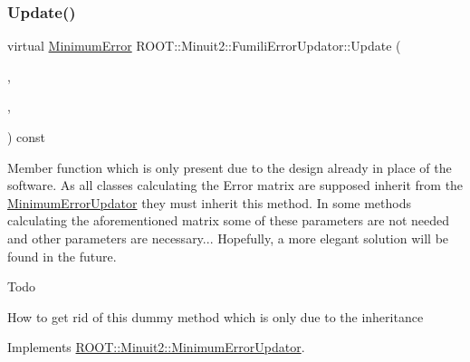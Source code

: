 \subsubsection{\texorpdfstring{Update()}{Update()}\hspace{0.1cm}{\footnotesize\ttfamily [4/6]}}
{\footnotesize\ttfamily virtual \mbox{\hyperlink{classROOT_1_1Minuit2_1_1MinimumError}{Minimum\+Error}} R\+O\+O\+T\+::\+Minuit2\+::\+Fumili\+Error\+Updator\+::\+Update (\begin{DoxyParamCaption}\item[{const \mbox{\hyperlink{classROOT_1_1Minuit2_1_1MinimumState}{Minimum\+State}} \&}]{,  }\item[{const \mbox{\hyperlink{classROOT_1_1Minuit2_1_1MinimumParameters}{Minimum\+Parameters}} \&}]{,  }\item[{const \mbox{\hyperlink{classROOT_1_1Minuit2_1_1FunctionGradient}{Function\+Gradient}} \&}]{ }\end{DoxyParamCaption}) const\hspace{0.3cm}{\ttfamily [virtual]}}

Member function which is only present due to the design already in place of the software. As all classes calculating the Error matrix are supposed inherit from the \mbox{\hyperlink{classROOT_1_1Minuit2_1_1MinimumErrorUpdator}{Minimum\+Error\+Updator}} they must inherit this method. In some methods calculating the aforementioned matrix some of these parameters are not needed and other parameters are necessary... Hopefully, a more elegant solution will be found in the future.

\begin{DoxyRefDesc}{Todo}
\item[\mbox{\hyperlink{todo__todo000019}{Todo}}]How to get rid of this dummy method which is only due to the inheritance\end{DoxyRefDesc}


Implements \mbox{\hyperlink{classROOT_1_1Minuit2_1_1MinimumErrorUpdator_ae75c33152c49ebf34e6119adc0bbbda9}{R\+O\+O\+T\+::\+Minuit2\+::\+Minimum\+Error\+Updator}}.

\mbox{\label{classROOT_1_1Minuit2_1_1FumiliErrorUpdator_ae5ee7f2052c474169dd19ffbc3755bd3}} 
